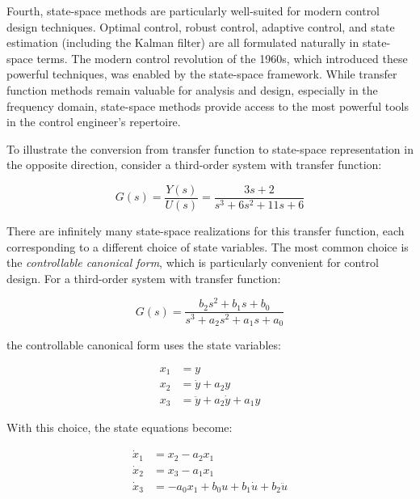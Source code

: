 Fourth, state-space methods are particularly well-suited for modern control design techniques. Optimal control, robust control, adaptive control, and state estimation (including the Kalman filter) are all formulated naturally in state-space terms. The modern control revolution of the 1960s, which introduced these powerful techniques, was enabled by the state-space framework. While transfer function methods remain valuable for analysis and design, especially in the frequency domain, state-space methods provide access to the most powerful tools in the control engineer's repertoire.

To illustrate the conversion from transfer function to state-space representation in the opposite direction, consider a third-order system with transfer function:

\begin{equation}
G(s) = \frac{Y(s)}{U(s)} = \frac{3s + 2}{s^3 + 6s^2 + 11s + 6}
\end{equation}

There are infinitely many state-space realizations for this transfer function, each corresponding to a different choice of state variables. The most common choice is the \emph{controllable canonical form}, which is particularly convenient for control design. For a third-order system with transfer function:

\begin{equation}
G(s) = \frac{b_2s^2 + b_1s + b_0}{s^3 + a_2s^2 + a_1s + a_0}
\end{equation}

the controllable canonical form uses the state variables:

\begin{subequations}
\begin{align}
x_1 &= y \\
x_2 &= \dot{y} + a_2y \\
x_3 &= \ddot{y} + a_2\dot{y} + a_1y
\end{align}
\end{subequations}

With this choice, the state equations become:

\begin{subequations}
\begin{align}
\dot{x}_1 &= x_2 - a_2x_1 \\
\dot{x}_2 &= x_3 - a_1x_1 \\
\dot{x}_3 &= -a_0x_1 + b_0u + b_1\dot{u} + b_2\ddot{u}
\end{align}
\end{subequations}


